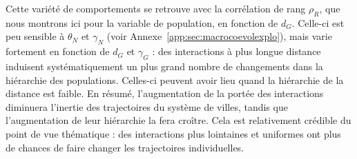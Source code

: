 Cette variété de comportements se retrouve avec la corrélation de rang $\rho_R$, que nous montrons ici pour la variable de population, en fonction de $d_G$. Celle-ci est peu sensible à $\theta_N$ et $\gamma_N$ (voir Annexe~\ref{app:sec:macrocoevolexplo}), mais varie fortement en fonction de $d_G$ et $\gamma_G$ : des interactions à plus longue distance induisent systématiquement un plus grand nombre de changements dans la hiérarchie des populations. Celles-ci peuvent avoir lieu quand la hiérarchie de la distance est faible. En résumé, l'augmentation de la portée des interactions diminuera l'inertie des trajectoires du système de villes, tandis que l'augmentation de leur hiérarchie la fera croître. Cela est relativement crédible du point de vue thématique : des interactions plus lointaines et uniformes ont plus de chances de faire changer les trajectoires individuelles.


